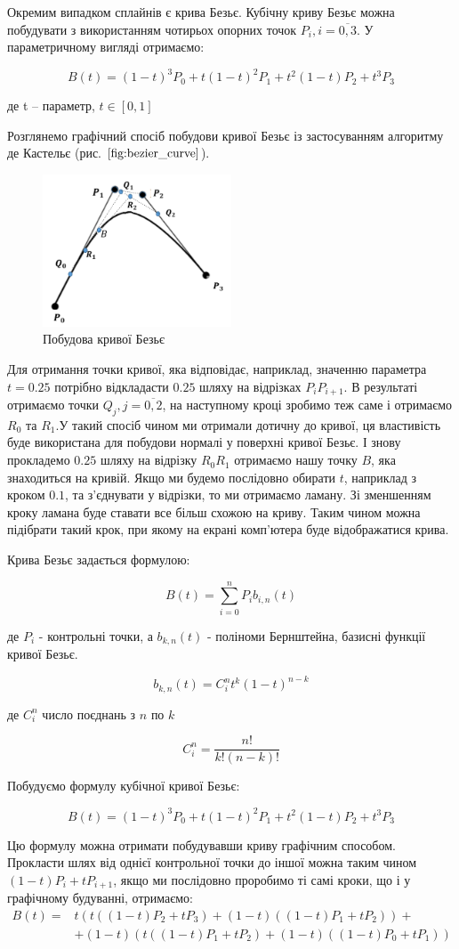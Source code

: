 \let\mypdfximage\pdfximage\def\pdfximage{\immediate\mypdfximage}\documentclass[14pt,a4paper]{extarticle}
\theoremstyle{definition}
\renewcommand{\[}{\begin{singlespace}\begin{equation*}}
\renewcommand{\]}{\end{equation*}\end{singlespace}}
\renewcommand{\+}{\discretionary{\mbox{\scriptsize$\hookleftarrow$}}{}{}}
\begin{document}
Окремим випадком сплайнів є крива Безьє. Кубічну криву Безьє можна побудувати з використанням чотирьох опорних точок $P_i, i=\overline{0,3}$. У параметричному вигляді отримаємо:
\[B(t)=(1-t)^3P_0+t(1-t)^2P_1+t^2(1-t)P_2+t^3P_3\]
де t -- параметр, $t \in [0,1]$

Розглянемо графічний спосіб побудови кривої Безьє із застосуванням алгоритму де Кастельє (рис. $\ref{fig:bezier_curve}$).

\begin{figure}[!htb]
    \centering
    \includegraphics[width=0.5\textwidth]{bezier-curve.png}
    \caption{Побудова кривої Безьє}\label{fig:bezier_curve}
\end{figure}

Для отримання точки кривої, яка відповідає, наприклад, значенню параметра $t=0.25$ потрібно відкладасти $0.25$ шляху на відрізках $P_iP_{i+1}$. В результаті отримаємо точки $Q_{j}, j=\overline{0,2}$, на наступному кроці зробимо теж саме і отримаємо $R_0$ та $R_1$.У такий спосіб чином ми отримали дотичну до кривої, ця властивість буде використана для побудови нормалі у поверхні кривої Безьє. І знову прокладемо $0.25$ шляху на відрізку $R_0R_1$ отримаємо нашу точку $B$, яка знаходиться на кривій. Якщо ми будемо послідовно обирати $t$, наприклад з кроком $0.1$, та з'єднувати у відрізки, то ми отримаємо ламану. Зі зменшенням кроку ламана буде ставати все більш схожою на криву. Таким чином можна підібрати такий крок, при якому на екрані комп'ютера буде відображатися крива.

Крива Безьє задається формулою:
\[B(t)=\sum_{i=0}^n P_i b_{i,n}(t)\]
де $P_i$ - контрольні точки, а $b_{k,n}(t)$ - поліноми Бернштейна, базисні функції кривої Безьє.
\[b_{k,n}(t)=C_i^nt^k(1-t)^{n-k}\]
де $C_i^n$ число поєднань з $n$ по $k$
\[C_i^n=\frac{n!}{k!(n-k)!}\]

Побудуємо формулу кубічної кривої Безьє:
\[B(t)=(1-t)^3P_0+t(1-t)^2P_1+t^2(1-t)P_2+t^3P_3\]

Цю формулу можна отримати побудувавши криву графічним способом. Прокласти шлях від однієї контрольної точки до іншої можна таким чином $(1-t)P_i+tP_{i+1}$, якщо ми послідовно проробимо ті самі кроки, що і у графічному будуванні, отримаємо:
\begin{align*}
B(t)=&t (t ((1 - t) P_{2} + t P_{3}) + (1 - t) ((1 - t) P_{1} + t P_{2})) +\\
&+(1 - t) (t ((1 - t) P_{1} + t P_{2}) + (1 - t) ((1 - t) P_{0} + t P_{1}))
\end{align*}
\end{document}
